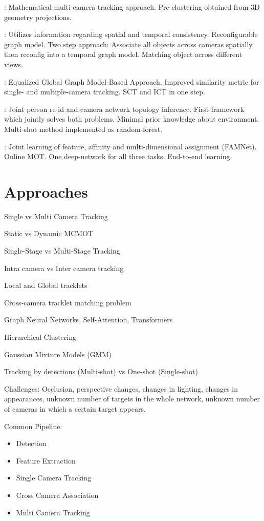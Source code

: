 \cite{Nguyen22a}: Mathematical multi-camera tracking approach. Pre-clustering obtained from 3D geometry projections.

\cite{Cheng23}: Utilizes information regarding spatial and temporal consistency. Reconfigurable graph model. Two step approach: Associate all objects across cameras spatially then reconfig into a temporal graph model. Matching object across different views.

\cite{Chen17a}: Equalized Global Graph Model-Based Approach. Improved similarity metric for single- and multiple-camera tracking. SCT and ICT in one step.

\cite{Cho19}: Joint person re-id and camera network topology inference. First framework which jointly solves both problems. Minimal prior knowledge about environment. Multi-shot method implemented as random-forest.

\cite{Chu19}: Joint learning of feature, affinity and multi-dimensional assignment (FAMNet). Online MOT. One deep-network for all three tasks. End-to-end learning.

\section{Approaches}

Single vs Multi Camera Tracking

Static vs Dynamic MCMOT

Single-Stage vs Multi-Stage Tracking

Intra camera vs Inter camera tracking

Local and Global tracklets

Cross-camera tracklet matching problem

Graph Neural Networks, Self-Attention, Transformers

Hierarchical Clustering

Gaussian Mixture Models (GMM)

Tracking by detections (Multi-shot) vs One-shot (Single-shot)

Challenges: Occlusion, perspective changes, changes in lighting, changes in appearances, unknown number of targets in the whole network, unknown number of cameras in which a certain target appears.

Common Pipeline:
\begin{itemize}
    \item Detection
    \item Feature Extraction
    \item Single Camera Tracking
    \item Cross Camera Association
    \item Multi Camera Tracking
\end{itemize}

